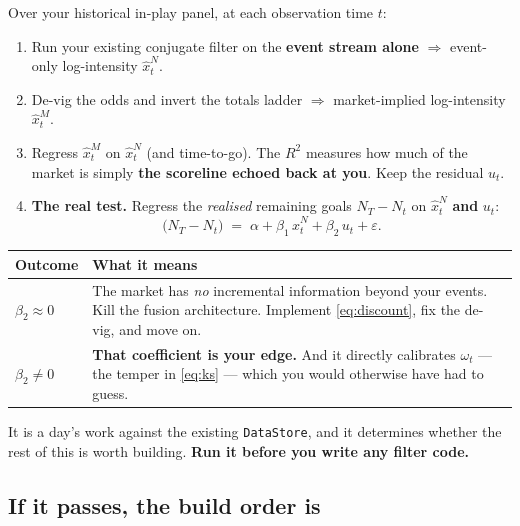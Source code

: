 \documentclass[11pt,a4paper]{article}
\theoremstyle{plain}
\begin{document}
Over your historical in-play panel, at each observation time $t$:

\begin{enumerate}
\item Run your existing conjugate filter on the \textbf{event stream alone} $\Rightarrow$
      event-only log-intensity $\hat x^N_t$.
\item De-vig the odds and invert the totals ladder $\Rightarrow$ market-implied log-intensity
      $\hat x^M_t$.
\item Regress $\hat x^M_t$ on $\hat x^N_t$ (and time-to-go). The $R^2$ measures how much of the
      market is simply \textbf{the scoreline echoed back at you}. Keep the residual $u_t$.
\item \textbf{The real test.} Regress the \emph{realised} remaining goals $N_T - N_t$ on
      $\hat x^N_t$ \textbf{and} $u_t$:
      \[
        \big(N_T - N_t\big) \;=\; \alpha + \beta_1\,\hat x^N_t + \beta_2\, u_t + \varepsilon.
      \]
\end{enumerate}

\begin{center}
\begin{tabular}{@{}lp{9.6cm}@{}}
\toprule
\textbf{Outcome} & \textbf{What it means} \\
\midrule
$\beta_2 \approx 0$ &
The market has \emph{no} incremental information beyond your events. Kill the fusion
architecture. Implement \eqref{eq:discount}, fix the de-vig, and move on. \\
\addlinespace
$\beta_2 \ne 0$ &
\textbf{That coefficient is your edge.} And it directly calibrates $\omega_t$ --- the temper in
\eqref{eq:ks} --- which you would otherwise have had to guess. \\
\bottomrule
\end{tabular}
\end{center}

\noindent
It is a day's work against the existing \texttt{DataStore}, and it determines whether the rest
of this is worth building. \textbf{Run it before you write any filter code.}

\subsection*{If it passes, the build order is}
\end{document}
